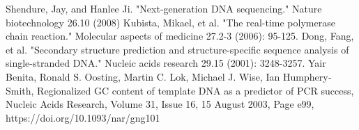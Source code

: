 \documentclass[a4paper,conference]{IEEEtran}
\begin{document}
\begin{thebibliography}{1}
Shendure, Jay, and Hanlee Ji. "Next-generation DNA sequencing." Nature biotechnology 26.10 (2008)
Kubista, Mikael, et al. "The real-time polymerase chain reaction." Molecular aspects of medicine 27.2-3 (2006): 95-125.
Dong, Fang, et al. "Secondary structure prediction and structure-specific sequence analysis of single-stranded DNA." Nucleic acids research 29.15 (2001): 3248-3257.
Yair Benita, Ronald S. Oosting, Martin C. Lok, Michael J. Wise, Ian Humphery‐Smith, Regionalized GC content of template DNA as a predictor of PCR success, Nucleic Acids Research, Volume 31, Issue 16, 15 August 2003, Page e99, https://doi.org/10.1093/nar/gng101
\end{thebibliography}




\end{document}
